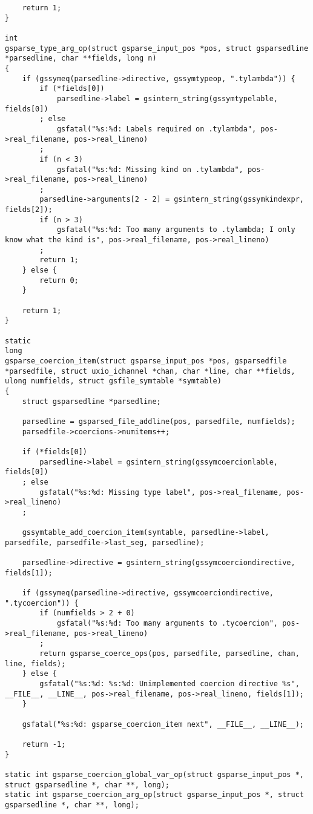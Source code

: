 \documentclass{report}
\begin{document}
\begin{verbatim}
    return 1;
}

int
gsparse_type_arg_op(struct gsparse_input_pos *pos, struct gsparsedline *parsedline, char **fields, long n)
{
    if (gssymeq(parsedline->directive, gssymtypeop, ".tylambda")) {
        if (*fields[0])
            parsedline->label = gsintern_string(gssymtypelable, fields[0])
        ; else
            gsfatal("%s:%d: Labels required on .tylambda", pos->real_filename, pos->real_lineno)
        ;
        if (n < 3)
            gsfatal("%s:%d: Missing kind on .tylambda", pos->real_filename, pos->real_lineno)
        ;
        parsedline->arguments[2 - 2] = gsintern_string(gssymkindexpr, fields[2]);
        if (n > 3)
            gsfatal("%s:%d: Too many arguments to .tylambda; I only know what the kind is", pos->real_filename, pos->real_lineno)
        ;
        return 1;
    } else {
        return 0;
    }

    return 1;
}

static
long
gsparse_coercion_item(struct gsparse_input_pos *pos, gsparsedfile *parsedfile, struct uxio_ichannel *chan, char *line, char **fields, ulong numfields, struct gsfile_symtable *symtable)
{
    struct gsparsedline *parsedline;

    parsedline = gsparsed_file_addline(pos, parsedfile, numfields);
    parsedfile->coercions->numitems++;

    if (*fields[0])
        parsedline->label = gsintern_string(gssymcoercionlable, fields[0])
    ; else
        gsfatal("%s:%d: Missing type label", pos->real_filename, pos->real_lineno)
    ;

    gssymtable_add_coercion_item(symtable, parsedline->label, parsedfile, parsedfile->last_seg, parsedline);

    parsedline->directive = gsintern_string(gssymcoerciondirective, fields[1]);

    if (gssymeq(parsedline->directive, gssymcoerciondirective, ".tycoercion")) {
        if (numfields > 2 + 0)
            gsfatal("%s:%d: Too many arguments to .tycoercion", pos->real_filename, pos->real_lineno)
        ;
        return gsparse_coerce_ops(pos, parsedfile, parsedline, chan, line, fields);
    } else {
        gsfatal("%s:%d: %s:%d: Unimplemented coercion directive %s", __FILE__, __LINE__, pos->real_filename, pos->real_lineno, fields[1]);
    }

    gsfatal("%s:%d: gsparse_coercion_item next", __FILE__, __LINE__);

    return -1;
}

static int gsparse_coercion_global_var_op(struct gsparse_input_pos *, struct gsparsedline *, char **, long);
static int gsparse_coercion_arg_op(struct gsparse_input_pos *, struct gsparsedline *, char **, long);


\end{verbatim}
\end{document}
